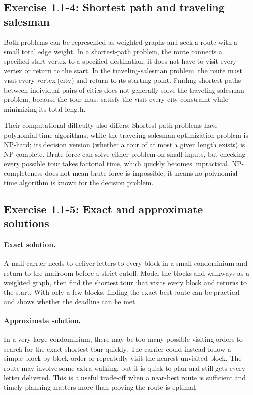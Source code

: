 \documentclass[11pt]{article}
\begin{document}
\subsection*{Exercise 1.1-4: Shortest path and traveling salesman}

Both problems can be represented as weighted graphs and seek a route with a
small total edge weight. In a shortest-path problem, the route connects a
specified start vertex to a specified destination; it does not have to visit
every vertex or return to the start. In the traveling-salesman problem, the
route must visit every vertex (city) and return to its starting point. Finding
shortest paths between individual pairs of cities does not generally solve the
traveling-salesman problem, because the tour must satisfy the visit-every-city
constraint while minimizing its total length.

Their computational difficulty also differs. Shortest-path problems have
polynomial-time algorithms, while the traveling-salesman optimization problem
is NP-hard; its decision version (whether a tour of at most a given length
exists) is NP-complete. Brute force can solve either problem on small inputs,
but checking every possible tour takes factorial time, which quickly becomes
impractical. NP-completeness does not mean brute force is impossible; it means
no polynomial-time algorithm is known for the decision problem.

\subsection*{Exercise 1.1-5: Exact and approximate solutions}

\paragraph{Exact solution.}
A mail carrier needs to deliver letters to every block in a small condominium
and return to the mailroom before a strict cutoff. Model the blocks and walkways
as a weighted graph, then find the shortest tour that visits every block and
returns to the start. With only a few blocks, finding the exact best route can
be practical and shows whether the deadline can be met.

\paragraph{Approximate solution.}
In a very large condominium, there may be too many possible visiting orders to
search for the exact shortest tour quickly. The carrier could instead follow a
simple block-by-block order or repeatedly visit the nearest unvisited block.
The route may involve some extra walking, but it is quick to plan and still gets
every letter delivered. This is a useful trade-off when a near-best route is
sufficient and timely planning matters more than proving the route is optimal.
\end{document}
